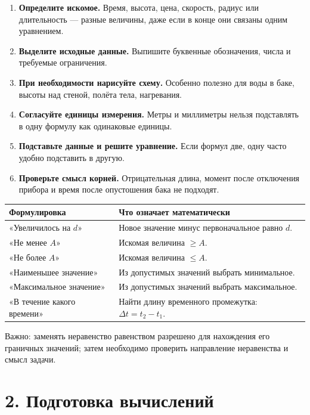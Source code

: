 \documentclass[a4paper,12pt]{article}
\newcommand{\smallnote}[1]{{\small\textcolor{muted}{#1}}}
\newcommand{\topic}[1]{\vspace{5pt}{\color{accent}\large\bfseries #1}\par\vspace{2pt}}
\begin{document}
\begin{enumerate}[label=\textcolor{accent}{\arabic*.}]
\item \textbf{Определите искомое.} Время, высота, цена, скорость, радиус или длительность --- разные величины, даже если в конце они связаны одним уравнением.
\item \textbf{Выделите исходные данные.} Выпишите буквенные обозначения, числа и требуемые ограничения.
\item \textbf{При необходимости нарисуйте схему.} Особенно полезно для воды в баке, высоты над стеной, полёта тела, нагревания.
\item \textbf{Согласуйте единицы измерения.} Метры и миллиметры нельзя подставлять в одну формулу как одинаковые единицы.
\item \textbf{Подставьте данные и решите уравнение.} Если формул две, одну часто удобно подставить в другую.
\item \textbf{Проверьте смысл корней.} Отрицательная длина, момент после отключения прибора и время после опустошения бака не подходят.
\end{enumerate}

\topic{Ключевые слова задачи}
\begin{tabularx}{\linewidth}{@{}p{.31\linewidth}X@{}}
\toprule
\textbf{Формулировка} & \textbf{Что означает математически}\\
\midrule
«Увеличилось на $d$» & Новое значение минус первоначальное равно $d$.\\
«Не менее $A$» & Искомая величина $\ge A$.\\
«Не более $A$» & Искомая величина $\le A$.\\
«Наименьшее значение» & Из допустимых значений выбрать минимальное.\\
«Максимальное значение» & Из допустимых значений выбрать максимальное.\\
«В течение какого времени» & Найти длину временного промежутка: $\Delta t=t_2-t_1$.\\
\bottomrule
\end{tabularx}

\smallnote{Важно: заменять неравенство равенством разрешено для нахождения его граничных значений; затем необходимо проверить направление неравенства и смысл задачи.}

\section*{2. Подготовка вычислений}
\end{document}
